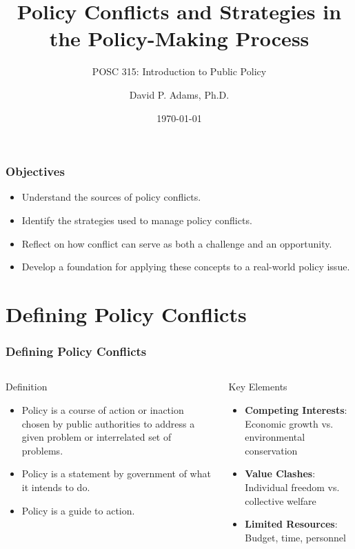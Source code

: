 \documentclass[10pt]{beamer}
\title{Policy Conflicts and Strategies in the Policy-Making Process}
\subtitle{POSC 315: Introduction to Public Policy}
\date{\today}
\author{David P. Adams, Ph.D.}
\institute{California State University, Fullerton}
\begin{document}
\maketitle



\begin{frame}
    \frametitle{Objectives}
    \begin{itemize}
        \item Understand the \alert{sources} of policy conflicts.
        \item Identify the \alert{strategies} used to manage policy conflicts.
        \item Reflect on how conflict can serve as both a \alert{challenge} and an \alert{opportunity}.
        \item Develop a foundation for applying these concepts to a \alert{real-world policy issue}.
    \end{itemize}
    \end{frame}

    \section{Defining Policy Conflicts}
    
    \begin{frame}
    \frametitle{Defining Policy Conflicts}
    \begin{columns}[T,onlytextwidth]
        \begin{block}{Definition}
            \begin{itemize}
                \item Policy is a \alert{course of action} or \alert{inaction} chosen by public authorities to address a given problem or interrelated set of problems.
                \item Policy is a \alert{statement} by government of what it intends to do.
                \item Policy is a \alert{guide} to action.
            \end{itemize}
        \end{block}
        \begin{exampleblock}{Key Elements}
            \begin{itemize}
                \item \textbf{Competing Interests}: Economic growth vs. environmental conservation
                \item \textbf{Value Clashes}: Individual freedom vs. collective welfare
                \item \textbf{Limited Resources}: Budget, time, personnel 
            \end{itemize}
        \end{exampleblock}
    \end{columns}
    \end{frame}
    
\end{document}

